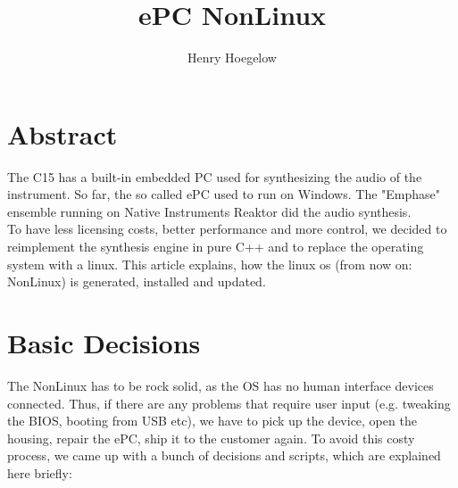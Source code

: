 \documentclass[10pt,a4paper]{article}
\author{Henry Hoegelow}
\title{ePC NonLinux}
\begin{document}
\maketitle
\section{Abstract}
The C15 has a built-in embedded PC used for synthesizing the audio of the instrument. So far, the so called ePC used to run on Windows. The "Emphase" ensemble running on Native Instruments Reaktor did the audio synthesis.\\
To have less licensing costs, better performance and more control, we decided to reimplement the synthesis engine in pure C++ and to replace the operating system with a linux. This article explains, how the linux os (from now on: NonLinux) is generated, installed and updated.

\section{Basic Decisions}
The NonLinux has to be rock solid, as the OS has no human interface devices connected. Thus, if there are any problems that require user input (e.g. tweaking the BIOS, booting from USB etc), we have to pick up the device, open the housing, repair the ePC, ship it to the customer again. To avoid this costy process, we came up with a bunch of decisions and scripts, which are explained here briefly:
\end{document}
